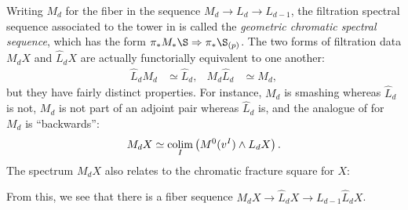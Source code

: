 \begin{remark}
Writing $M_d$ for the fiber in the sequence $M_d \to L_d \to L_{d-1}$, the filtration spectral sequence associated to the tower in  is called the \textit{geometric chromatic spectral sequence}, which has the form $\pi_* M_* \S \Rightarrow \pi_* \S_{(p)}$.  The two forms of filtration data $M_d X$ and $\widehat L_d X$ are actually functorially equivalent to one another:
\begin{align*}
\widehat L_d M_d & \simeq \widehat L_d, &
M_d \widehat L_d & \simeq M_d,
\end{align*}
but they have fairly distinct properties.  For instance, $M_d$ is smashing whereas $\widehat L_d$ is not, $M_d$ is not part of an adjoint pair whereas $\widehat L_d$ is, and the analogue of  for $M_d$ is ``backwards'': \[M_d X \simeq \operatorname*{colim}_I \left( M^0(v^I) \wedge L_d X \right).\]  The spectrum $M_d X$ also relates to the chromatic fracture square for $X$:
\begin{center}
\end{center}
From this, we see that there is a fiber sequence $M_d X \to \widehat L_d X \to L_{d-1} \widehat L_d X$.


\end{remark}
